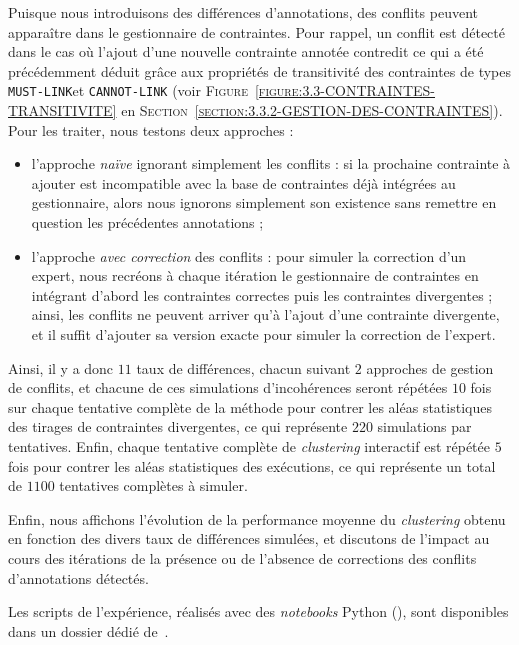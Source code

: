 			Puisque nous introduisons des différences d'annotations, des conflits peuvent apparaître dans le gestionnaire de contraintes.
			Pour rappel, un conflit est détecté dans le cas où l'ajout d'une nouvelle contrainte annotée contredit ce qui a été précédemment déduit grâce aux propriétés de transitivité des contraintes de types \texttt{MUST-LINK}et \texttt{CANNOT-LINK} (voir \textsc{Figure~\ref{figure:3.3-CONTRAINTES-TRANSITIVITE}} en \textsc{Section~\ref{section:3.3.2-GESTION-DES-CONTRAINTES}}).
			Pour les traiter, nous testons deux approches :
			\begin{itemize}
				\item l'approche \textit{naïve} ignorant simplement les conflits : si la prochaine contrainte à ajouter est incompatible avec la base de contraintes déjà intégrées au gestionnaire, alors nous ignorons simplement son existence sans remettre en question les précédentes annotations ;
				\item l'approche \textit{avec correction} des conflits : pour simuler la correction d'un expert, nous recréons à chaque itération le gestionnaire de contraintes en intégrant d'abord les contraintes correctes puis les contraintes divergentes ; ainsi, les conflits ne peuvent arriver qu'à l'ajout d'une contrainte divergente, et il suffit d'ajouter sa version exacte pour simuler la correction de l'expert.
			\end{itemize}
			
			Ainsi, il y a donc $11$ taux de différences, chacun suivant $2$ approches de gestion de conflits, et chacune de ces simulations d'incohérences seront répétées $10$ fois sur chaque tentative complète de la méthode pour contrer les aléas statistiques des tirages de contraintes divergentes, ce qui représente $220$ simulations par tentatives.
			Enfin, chaque tentative complète de \textit{clustering} interactif est répétée $5$ fois pour contrer les aléas statistiques des exécutions, ce qui représente un total de $1100$ tentatives complètes à simuler.

			Enfin, nous affichons l'évolution de la performance moyenne du \textit{clustering} obtenu en fonction des divers taux de différences simulées, et discutons de l'impact au cours des itérations de la présence ou de l'absence de corrections des conflits d'annotations détectés.
			
			\begin{leftBarInformation}
				Les scripts de l'expérience, réalisés avec des \textit{notebooks} Python (\cite{van-rossum-drake:2009:python-reference-manual}), sont disponibles dans un dossier dédié de~\cite{schild:2021:cognitivefactory-interactiveclusteringcomparativestudy}.
			\end{leftBarInformation}

